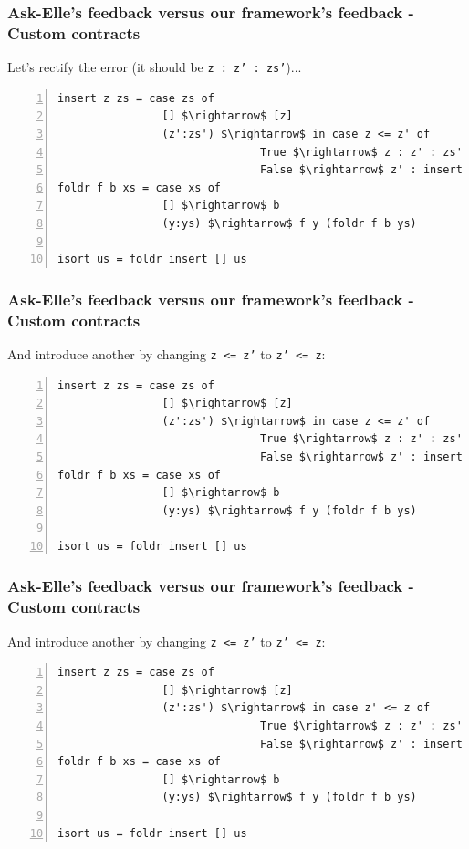 \documentclass[]{beamer}
\begin{document}
\begin{frame}[fragile]
\frametitle{Ask-Elle's feedback versus our framework's feedback - Custom contracts}

Let's rectify the error (it should be \texttt{z : z' : zs'})...

\begin{lstlisting}[mathescape,numbers=left]
insert z zs = case zs of
                [] $\rightarrow$ [z]
                (z':zs') $\rightarrow$ in case z <= z' of
                               True $\rightarrow$ z : z' : zs'
                               False $\rightarrow$ z' : insert z zs'
foldr f b xs = case xs of
                [] $\rightarrow$ b
                (y:ys) $\rightarrow$ f y (foldr f b ys)
                
isort us = foldr insert [] us
\end{lstlisting}

\end{frame}

\begin{frame}[fragile]
\frametitle{Ask-Elle's feedback versus our framework's feedback - Custom contracts}

And introduce another by changing \texttt{z <= z'} to \texttt{z' <= z}:

\begin{lstlisting}[mathescape,numbers=left]
insert z zs = case zs of
                [] $\rightarrow$ [z]
                (z':zs') $\rightarrow$ in case z <= z' of
                               True $\rightarrow$ z : z' : zs'
                               False $\rightarrow$ z' : insert z zs'
foldr f b xs = case xs of
                [] $\rightarrow$ b
                (y:ys) $\rightarrow$ f y (foldr f b ys)
                
isort us = foldr insert [] us
\end{lstlisting}

\end{frame}

\begin{frame}[fragile]
\frametitle{Ask-Elle's feedback versus our framework's feedback - Custom contracts}

And introduce another by changing \texttt{z <= z'} to \texttt{z' <= z}:

\begin{lstlisting}[mathescape,numbers=left]
insert z zs = case zs of
                [] $\rightarrow$ [z]
                (z':zs') $\rightarrow$ in case z' <= z of
                               True $\rightarrow$ z : z' : zs'
                               False $\rightarrow$ z' : insert z zs'
foldr f b xs = case xs of
                [] $\rightarrow$ b
                (y:ys) $\rightarrow$ f y (foldr f b ys)
                
isort us = foldr insert [] us
\end{lstlisting}

\end{frame}
\end{document}
